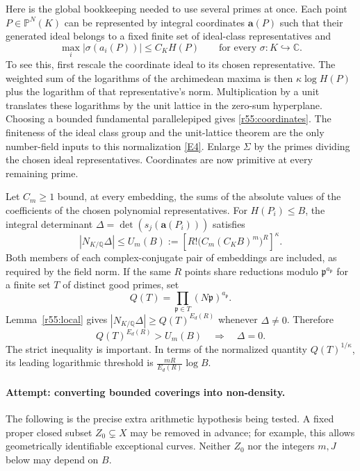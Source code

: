 \documentclass[11pt,a4paper]{article}
\newcommand{\Q}{\mathbb{Q}}
\newcommand{\C}{\mathbb{C}}
\newcommand{\eref}[2]{\hyperlink{extra:#1:#2}{[E#2]}}
\numberwithin{equation}{section}
\begin{document}
Here is the global bookkeeping needed to use several primes at once. Each point $P\in\mathbb P^N(K)$ can be represented by integral coordinates $\mathbf a(P)$ such that their generated ideal belongs to a fixed finite set of ideal-class representatives and
\begin{equation}\label{r55:coordinates}
 \max_i|\sigma(a_i(P))|\leq C_K H(P)
 \qquad\text{for every }\sigma:K\hookrightarrow\C.
\end{equation}
To see this, first rescale the coordinate ideal to its chosen representative. The weighted sum of the logarithms of the archimedean maxima is then $\kappa\log H(P)$ plus the logarithm of that representative's norm. Multiplication by a unit translates these logarithms by the unit lattice in the zero-sum hyperplane. Choosing a bounded fundamental parallelepiped gives \eqref{r55:coordinates}. The finiteness of the ideal class group and the unit-lattice theorem are the only number-field inputs to this normalization \eref{statement}{4}. Enlarge $\Sigma$ by the primes dividing the chosen ideal representatives. Coordinates are now primitive at every remaining prime.

Let $C_m\geq1$ bound, at every embedding, the sums of the absolute values of the coefficients of the chosen polynomial representatives. For $H(P_i)\leq B$, the integral determinant
$\Delta=\det(s_j(\mathbf a(P_i)))$ satisfies
\begin{equation}\label{r55:normupper}
 |N_{K/\Q}\Delta|
 \leq U_m(B):=\left[R!\bigl(C_m(C_KB)^m\bigr)^R\right]^\kappa.
\end{equation}
Both members of each complex-conjugate pair of embeddings are included, as required by the field norm. If the same $R$ points share reductions modulo $\mathfrak p^{a_{\mathfrak p}}$ for a finite set $T$ of distinct good primes, set
\[
 Q(T)=\prod_{\mathfrak p\in T}(N\mathfrak p)^{a_{\mathfrak p}}.
\]
Lemma~\ref{r55:local} gives $|N_{K/\Q}\Delta|\geq Q(T)^{E_d(R)}$ whenever $\Delta\ne0$. Therefore
\begin{equation}\label{r55:threshold}
 Q(T)^{E_d(R)}>U_m(B)
 \quad\Longrightarrow\quad \Delta=0.
\end{equation}
The strict inequality is important. In terms of the normalized quantity $Q(T)^{1/\kappa}$, its leading logarithmic threshold is $\frac{mR}{E_d(R)}\log B$.

\paragraph{Attempt: converting bounded coverings into non-density.}
The following is the precise extra arithmetic hypothesis being tested. A fixed proper closed subset $Z_0\subsetneq X$ may be removed in advance; for example, this allows geometrically identifiable exceptional curves. Neither $Z_0$ nor the integers $m,J$ below may depend on $B$.
\end{document}
